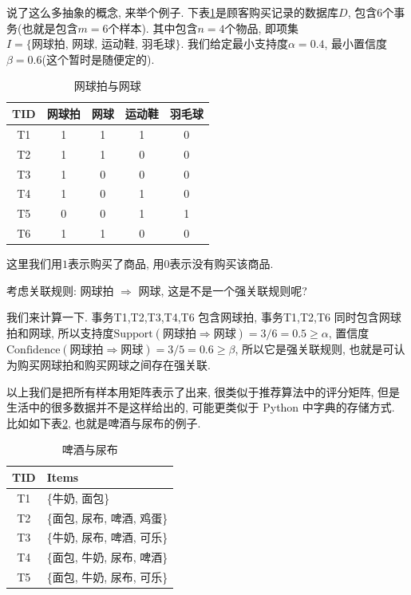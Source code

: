 \documentclass[a4paper,UTF8]{ctexart}
\theoremstyle{plain} \newtheorem{theorem}{定理}[section]
\theoremstyle{plain} \newtheorem{definition}{定义}[section]
\theoremstyle{plain} \newtheorem{lemma}{引理}[section]
\theoremstyle{plain} \newtheorem{proposition}{命题}[section]
\theoremstyle{plain} \newtheorem{example}{例}[section]
\theoremstyle{plain} \newtheorem{remark}{注}[section]
\theoremstyle{plain} \newtheorem{corollary}{推论}[section]
\begin{document}
说了这么多抽象的概念, 来举个例子. 下表\ref{tennis}是顾客购买记录的数据库$D$, 包含$6$个事务(也就是包含$m = 6$个样本). 其中包含$n = 4$个物品, 即项集$I = \{\textrm{网球拍, 网球, 运动鞋, 羽毛球}\}$. 我们给定最小支持度$\alpha = 0.4$, 最小置信度$\beta = 0.6$(这个暂时是随便定的).
\begin{table}[!htb]
\centering
\caption{网球拍与网球}
\label{tennis}
\begin{tabular}{c|c|c|c|c}
	\hline
    \textbf{TID} & \textbf{网球拍} & \textbf{网球} & \textbf{运动鞋} & \textbf{羽毛球} \\
    \hline
    T1 & 1 & 1 & 1 & 0 \\
    \hline
    T2 & 1 & 1 & 0 & 0 \\
    \hline
    T3 & 1 & 0 & 0 & 0 \\
    \hline
    T4 & 1 & 0 & 1 & 0 \\
    \hline
    T5 & 0 & 0 & 1 & 1 \\
    \hline
    T6 & 1 & 1 & 0 & 0 \\
	\hline
\end{tabular}
\end{table}

这里我们用$1$表示购买了商品, 用$0$表示没有购买该商品.

考虑关联规则: 网球拍 $\Rightarrow$ 网球, 这是不是一个强关联规则呢?

我们来计算一下. 事务T1,T2,T3,T4,T6 包含网球拍, 事务T1,T2,T6 同时包含网球拍和网球, 所以支持度$\mathrm{Support}(\textrm{网球拍} \Rightarrow \textrm{网球}) = 3 / 6 = 0.5 \geqslant \alpha$, 置信度$\mathrm{Confidence}(\textrm{网球拍} \Rightarrow \textrm{网球}) = 3 / 5 = 0.6 \geqslant \beta$, 所以它是强关联规则, 也就是可认为购买网球拍和购买网球之间存在强关联.

以上我们是把所有样本用矩阵表示了出来, 很类似于推荐算法中的评分矩阵, 但是生活中的很多数据并不是这样给出的, 可能更类似于 Python 中字典的存储方式. 比如如下表\ref{beers}, 也就是啤酒与尿布的例子.
\begin{table}[!htb]
\centering
\caption{啤酒与尿布}
\label{beers}
\begin{tabular}{c|l}
	\hline
    \textbf{TID} & \textbf{Items}  \\
    \hline
    T1 & \{牛奶, 面包\}  \\
    \hline
    T2 & \{面包, 尿布, 啤酒, 鸡蛋\}  \\
    \hline
    T3 & \{牛奶, 尿布, 啤酒, 可乐\}  \\
    \hline
    T4 & \{面包, 牛奶, 尿布, 啤酒\}  \\ 
    \hline
    T5 & \{面包, 牛奶, 尿布, 可乐\}  \\
	\hline
\end{tabular}
\end{table}
\end{document}
